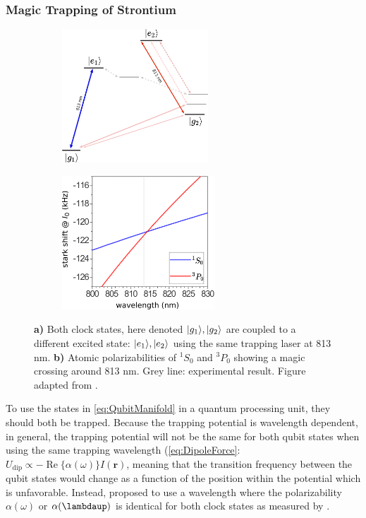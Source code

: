 \subsubsection*{Magic Trapping of Strontium}\label{sec:Magic}

\begin{figure}
\centering
	\begin{subfigure}{.4\textwidth}
		\centering
		\includegraphics[height=5cm]{figures/2groundTweezer.pdf}
		\caption{}
		\label{fig:2LevelTweezer}
	\end{subfigure}
	\begin{subfigure}{.5\textwidth}
		\centering
		\includegraphics[height=5cm]{figures/Magic.pdf}
		\caption{}
		\label{fig:BoydMagic}
	\end{subfigure}
	\caption{\textbf{a)} Both clock states, here denoted $\lvert g_1\rangle, \lvert g_2\rangle$ are coupled to a different excited state: $\lvert e_1\rangle, \lvert e_2\rangle$ using the same trapping laser at 813 nm.\textbf{ b)} Atomic polarizabilities of ${}^1S_0$ and ${}^3P_0$ showing a magic crossing around 813 nm. Grey line: experimental result. Figure adapted from \cite{Boyd2007}.}
	\label{fig:GerschbergSaxton}
\end{figure}

To use the states in \cref{eq:QubitManifold} in a quantum processing unit, they should both be trapped. Because the trapping potential is wavelength dependent, in general, the trapping potential will not be the same for both qubit states when using the same trapping wavelength (\cref{eq:DipoleForce}: $U_{\text{dip}} \propto - \operatorname{Re}\{\alpha(\omega)\} I(\mathbf{r})$, meaning that the transition frequency between the qubit states would change as a function of the position within the potential which is unfavorable. Instead, \cite{Katori2003} proposed to use a wavelength where the polarizability $\alpha(\omega)$ or $\alpha(\lambdaup)$ is identical for both clock states as measured by \cite{Takamoto2005,Jun2008}.


